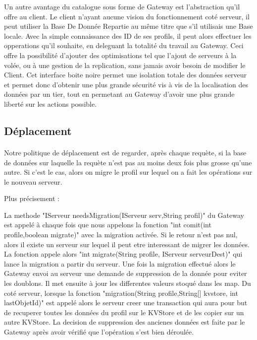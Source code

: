 Un autre avantage du catalogue sous forme de Gateway est l'abstraction qu'il offre au client. Le client n'ayant aucune vision du fonctionnement coté serveur, il peut utiliser la Base De Donnée Repartie au même titre que s'il utilisais une Base locale. Avec la simple connaissance des ID de ses profils, il peut alors effectuer les opperations qu'il souhaite, en deleguant la totalité du travail au Gateway. Ceci offre la possibilité d'ajouter des optimisations tel que l'ajout de serveurs à la volée, ou à une gestion de la replication, sans jamais avoir besoin de modifier le Client.
Cet interface boite noire permet une isolation totale des données serveur et permet donc d'obtenir une plus grande sécurité vis à vis de la localisation des données par un tier, tout en permetant au Gateway d'avoir une plus grande liberté sur les actions possible. 

\subsection{Déplacement}

\paragraph{}
Notre politique de déplacement est de regarder, après chaque requète, si la base de données sur laquelle la requète n'est pas au moins deux fois plus grosse qu'une autre. Si c'est le cas, alors on migre le profil sur lequel on a fait les opérations sur le nouveau serveur.

Plus précisement :

La methode "IServeur needsMigration(IServeur serv,String profil)" du Gateway est appelé à chaque fois que nous appelons la fonction "int comit(int profile,boolean migrate)" avec la migration activée. Si le retour n'est pas nul, alors il existe un serveur sur lequel il peut etre interessant de migrer les données. La fonction appele alors "int migrate(String profile, IServeur serveurDest)" qui lance la migration a partir du serveur.
Une fois la migration effectué alors le Gateway envoi au serveur une demande de suppression de la donnée pour eviter les doublons. Il met ensuite à jour les differentes valeurs stoqué dans les map.
Du coté serveur, lorsque la fonction "migration(String profile,String[] kvstore, int lastObjetId)" est appelé alors le serveur creer une transaction qui aura pour but de recuperer toutes les données du profil sur le KVStore et de les copier sur un autre KVStore. La decision de suppression des ancienes données est faite par le Gateway après avoir vérifié que l'opération s'est bien déroulée.


